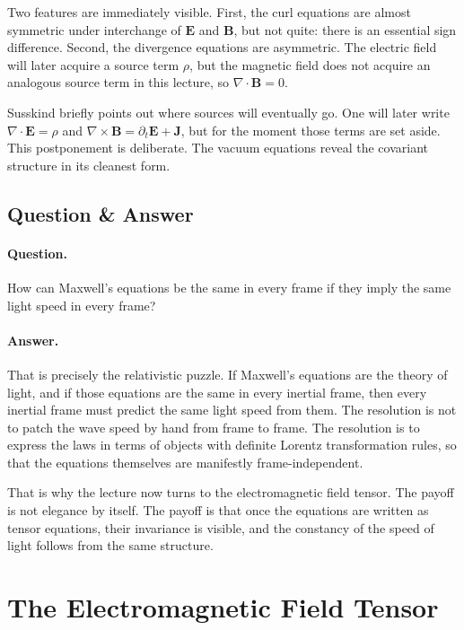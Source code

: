 Two features are immediately visible. First, the curl equations are almost symmetric under interchange of \(\mathbf E\) and \(\mathbf B\), but not quite: there is an essential sign difference. Second, the divergence equations are asymmetric. The electric field will later acquire a source term \(\rho\), but the magnetic field does not acquire an analogous source term in this lecture, so \(\nabla\cdot\mathbf B=0\).

Susskind briefly points out where sources will eventually go. One will later write
\(\nabla\cdot\mathbf E=\rho\) and \(\nabla\times\mathbf B=\partial_t\mathbf E+\mathbf J\), but for the moment those terms are set aside. This postponement is deliberate. The vacuum equations reveal the covariant structure in its cleanest form.

\subsection{Question \& Answer}

\paragraph{Question.} How can Maxwell's equations be the same in every frame if they imply the same light speed in every frame?

\paragraph{Answer.} That is precisely the relativistic puzzle. If Maxwell's equations are the theory of light, and if those equations are the same in every inertial frame, then every inertial frame must predict the same light speed from them. The resolution is not to patch the wave speed by hand from frame to frame. The resolution is to express the laws in terms of objects with definite Lorentz transformation rules, so that the equations themselves are manifestly frame-independent.

That is why the lecture now turns to the electromagnetic field tensor. The payoff is not elegance by itself. The payoff is that once the equations are written as tensor equations, their invariance is visible, and the constancy of the speed of light follows from the same structure.

\section{The Electromagnetic Field Tensor}

